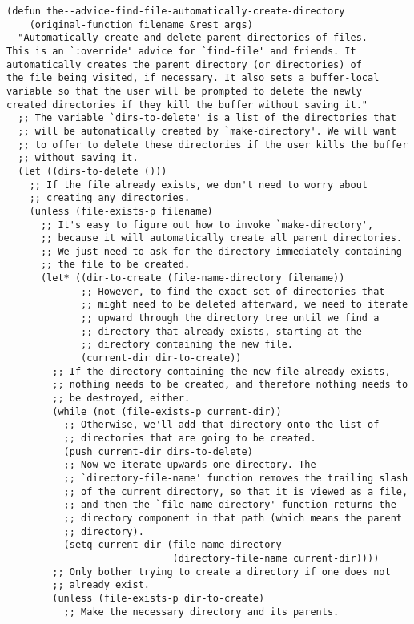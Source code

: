 \documentclass[11pt]{article}
\begin{document}
\begin{enumerate}
\begin{verbatim}
(defun the--advice-find-file-automatically-create-directory
    (original-function filename &rest args)
  "Automatically create and delete parent directories of files.
This is an `:override' advice for `find-file' and friends. It
automatically creates the parent directory (or directories) of
the file being visited, if necessary. It also sets a buffer-local
variable so that the user will be prompted to delete the newly
created directories if they kill the buffer without saving it."
  ;; The variable `dirs-to-delete' is a list of the directories that
  ;; will be automatically created by `make-directory'. We will want
  ;; to offer to delete these directories if the user kills the buffer
  ;; without saving it.
  (let ((dirs-to-delete ()))
    ;; If the file already exists, we don't need to worry about
    ;; creating any directories.
    (unless (file-exists-p filename)
      ;; It's easy to figure out how to invoke `make-directory',
      ;; because it will automatically create all parent directories.
      ;; We just need to ask for the directory immediately containing
      ;; the file to be created.
      (let* ((dir-to-create (file-name-directory filename))
             ;; However, to find the exact set of directories that
             ;; might need to be deleted afterward, we need to iterate
             ;; upward through the directory tree until we find a
             ;; directory that already exists, starting at the
             ;; directory containing the new file.
             (current-dir dir-to-create))
        ;; If the directory containing the new file already exists,
        ;; nothing needs to be created, and therefore nothing needs to
        ;; be destroyed, either.
        (while (not (file-exists-p current-dir))
          ;; Otherwise, we'll add that directory onto the list of
          ;; directories that are going to be created.
          (push current-dir dirs-to-delete)
          ;; Now we iterate upwards one directory. The
          ;; `directory-file-name' function removes the trailing slash
          ;; of the current directory, so that it is viewed as a file,
          ;; and then the `file-name-directory' function returns the
          ;; directory component in that path (which means the parent
          ;; directory).
          (setq current-dir (file-name-directory
                             (directory-file-name current-dir))))
        ;; Only bother trying to create a directory if one does not
        ;; already exist.
        (unless (file-exists-p dir-to-create)
          ;; Make the necessary directory and its parents.

\end{verbatim}
\end{enumerate}
\end{document}
